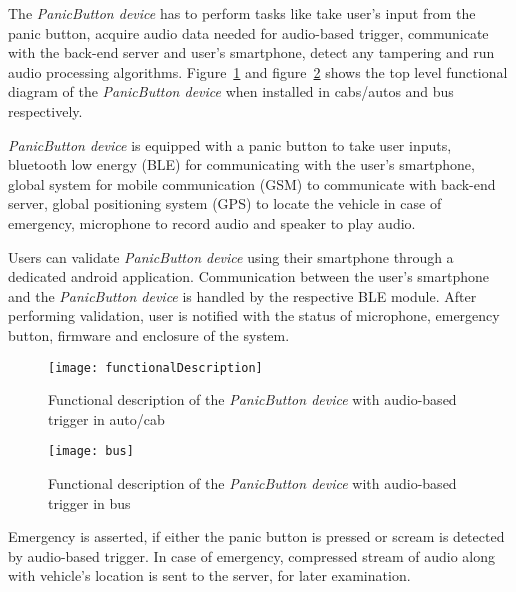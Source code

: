 The \emph{PanicButton device} has to perform tasks like take user's input from the panic button, acquire audio data needed for audio-based trigger, communicate with the back-end server and user's smartphone, detect any tampering and run audio processing algorithms. Figure~\ref{fig:functionalDesc} and  figure~\ref{fig:functionalDescbus} shows the top level functional diagram of the \emph{PanicButton device} when installed in cabs/autos and bus respectively.

\emph{PanicButton device} is equipped with a panic button to take user inputs, bluetooth low energy (BLE) for communicating with the user's smartphone, global system for mobile communication (GSM) to communicate with back-end server, global positioning system (GPS) to locate the vehicle in case of emergency, microphone to record audio and speaker to play audio.

Users can validate \emph{PanicButton device} using their smartphone through a dedicated android application. Communication between the user's smartphone and the \emph{PanicButton device} is handled by the respective BLE module. After performing validation, user is notified with the status of microphone, emergency button, firmware and enclosure of the system.

%

%
\begin{figure}[H]
\centering
\def\svgwidth{\textwidth}
\texttt{[image: functionalDescription]}
\caption{Functional description of the \emph{PanicButton device} with audio-based trigger in auto/cab}
\label{fig:functionalDesc}
\end{figure}

\begin{figure}[H]
\centering
\def\svgwidth{\textwidth}
\texttt{[image: bus]}
\caption{Functional description of the \emph{PanicButton device} with audio-based trigger in bus}
  \label{fig:functionalDescbus}
\end{figure}

Emergency is asserted, if either the panic button is pressed or scream is detected by audio-based trigger. In case of emergency, compressed stream of audio along with vehicle's location is sent to the server, for later examination.


